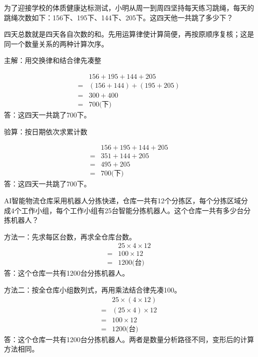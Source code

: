 为了迎接学校的体质健康达标测试，小明从周一到周四坚持每天练习跳绳，每天的跳绳次数如下：156下、195下、144下、205下。这四天他一共跳了多少下？\par
\begin{BookAnswer}
四天总数就是四天各自次数的和。先用运算律使计算简便，再按原顺序复核；这是同一个数量关系的两种计算次序。\par 主解：用交换律和结合律先凑整\par \[\begin{aligned} &156+195+144+205\\={}&(156+144)+(195+205)\\={}&300+400\\={}&700\text{(下)}\end{aligned}\]答：这四天一共跳了700下。\par 验算：按日期依次求累计数\par \[\begin{aligned} &156+195+144+205\\={}&351+144+205\\={}&495+205\\={}&700\text{(下)}\end{aligned}\]答：这四天一共跳了700下。\par
\end{BookAnswer}

AI智能物流仓库采用机器人分拣快递，仓库一共有12个分拣区，每个分拣区域分成4个工作小组，每个工作小组有25台智能分拣机器人。这个仓库一共有多少台分拣机器人？\par
\begin{BookAnswer}
方法一：先求每区台数，再求全仓库台数。\[\begin{aligned}&25\times4\times12\\={}&100\times12\\={}&1200\text{(台)}\end{aligned}\]答：这个仓库一共有1200台分拣机器人。\par 方法二：按全仓库小组数列式，再用乘法结合律先凑100。\[\begin{aligned}&25\times(4\times12)\\={}&(25\times4)\times12\\={}&100\times12\\={}&1200\text{(台)}\end{aligned}\]答：这个仓库一共有1200台分拣机器人。两者是数量分析路径不同，变形后的计算方法相同。
\end{BookAnswer}

